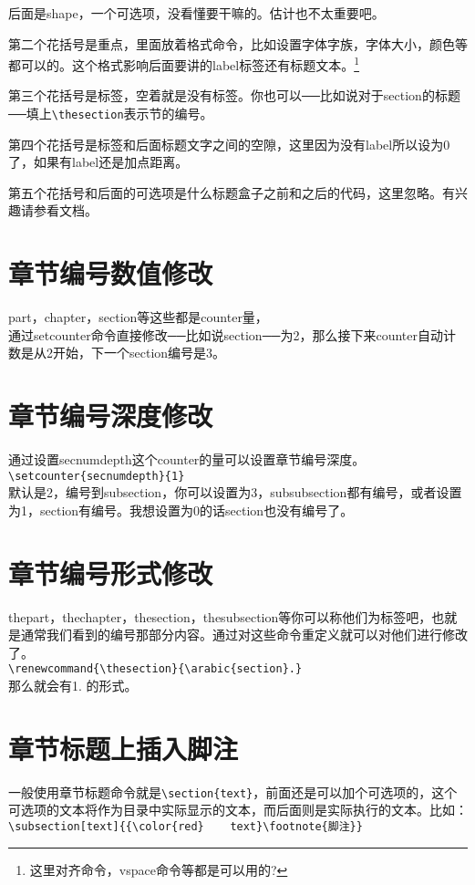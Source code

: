 \documentclass[11pt,oneside]{book}
\begin{document}
  后面是shape，一个可选项，没看懂要干嘛的。估计也不太重要吧。

  第二个花括号是重点，里面放着格式命令，比如设置字体字族，字体大小，颜色等都可以的。这个格式影响后面要讲的label标签还有标题文本。\footnote{这里对齐命令，vspace命令等都是可以用的?}

  第三个花括号是标签，空着就是没有标签。你也可以──比如说对于section的标题──填上\verb+\thesection+表示节的编号。

  第四个花括号是标签和后面标题文字之间的空隙，这里因为没有label所以设为0了，如果有label还是加点距离。

  第五个花括号和后面的可选项是什么标题盒子之前和之后的代码，这里忽略。有兴趣请参看文档。


  \section{章节编号数值修改}
  part，chapter，section等这些都是counter量，\\通过setcounter命令直接修改──比如说section──为2，那么接下来counter自动计数是从2开始，下一个section编号是3。

  \section{章节编号深度修改}
  通过设置secnumdepth这个counter的量可以设置章节编号深度。\\
  \verb+\setcounter{secnumdepth}{1} +\\
  默认是2，编号到subsection，你可以设置为3，subsubsection都有编号，或者设置为1，section有编号。我想设置为0的话section也没有编号了。

  \section{章节编号形式修改}
  \label{sec:章节编号形式修改}
  thepart，thechapter，thesection，thesubsection等你可以称他们为标签吧，也就是通常我们看到的编号那部分内容。通过对这些命令重定义就可以对他们进行修改了。\\
  \verb+\renewcommand{\thesection}{\arabic{section}.}+\\
  那么就会有1. 的形式。

  \section{章节标题上插入脚注}
  一般使用章节标题命令就是\verb+\section{text}+，前面还是可以加个可选项的，这个可选项的文本将作为目录中实际显示的文本，而后面则是实际执行的文本。比如：\\
  \verb+\subsection[text]{{\color{red}    text}\footnote{脚注}}+
\end{document}
